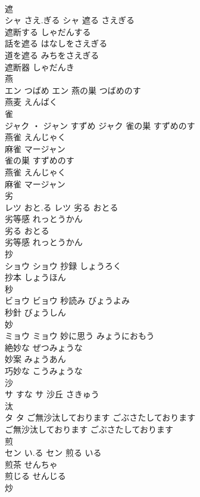 \documentclass[8pt]{extreport}
\begin{document}
\begin{CJK}{UTF8}{min}
\\	遮	
\\	シャ	さえ.ぎる	シャ	遮る	さえぎる	
\\	遮断する	しゃだんする	
\\	話を遮る	はなしをさえぎる	
\\	道を遮る	みちをさえぎる	
\\	遮断器	しゃだんき	
\\	燕	
\\	エン	つばめ	エン	燕の巣	つばめのす	
\\	燕麦	えんばく	
\\	雀	
\\	ジャク ・ ジャン	すずめ	ジャク	雀の巣	すずめのす	
\\	燕雀	えんじゃく	
\\	麻雀	マージャン	
\\	雀の巣	すずめのす	
\\	燕雀	えんじゃく	
\\	麻雀	マージャン	
\\	劣	
\\	レツ	おと.る	レツ	劣る	おとる	
\\	劣等感	れっとうかん	
\\	劣る	おとる	
\\	劣等感	れっとうかん	
\\	抄	
\\	ショウ		ショウ	抄録	しょうろく	
\\	抄本	しょうほん	
\\	秒	
\\	ビョウ		ビョウ	秒読み	びょうよみ	
\\	秒針	びょうしん	
\\	妙	
\\	ミョウ		ミョウ	妙に思う	みょうにおもう	
\\	絶妙な	ぜつみょうな	
\\	妙案	みょうあん	
\\	巧妙な	こうみょうな	
\\	沙	
\\	サ	すな	サ													沙丘	さきゅう	
\\	汰	
\\	タ		タ	ご無沙汰しております	ごぶさたしております	
\\	ご無沙汰しております	ごぶさたしております	
\\	煎	
\\	セン	い.る	セン	煎る	いる	
\\	煎茶	せんちゃ	
\\	煎じる	せんじる	
\\	炒	

\end{CJK}
\end{document}
